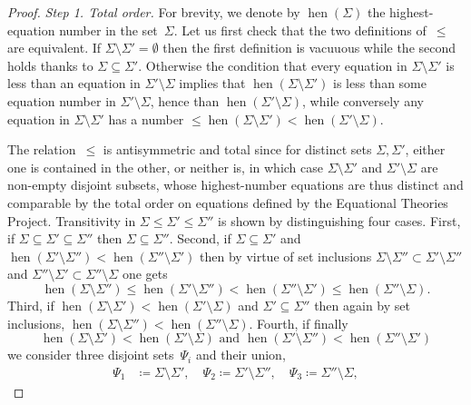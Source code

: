 \documentclass[12pt]{amsart}
\theoremstyle{plain}
\theoremstyle{definition}
\DeclareMathOperator{\hen}{hen}
\begin{document}
\begin{proof}
  {\it Step 1. Total order.}
  For brevity, we denote by $\hen(\Sigma)$ the highest-equation number in the set~$\Sigma$.
  Let us first check that the two definitions of~$\leq$ are equivalent.  If $\Sigma\setminus\Sigma'=\emptyset$ then the first definition is vacuuous while the second holds thanks to $\Sigma\subseteq\Sigma'$.  Otherwise the condition that every equation in $\Sigma\setminus\Sigma'$ is less than an equation in $\Sigma'\setminus\Sigma$ implies that $\hen(\Sigma\setminus\Sigma')$ is less than some equation number in $\Sigma'\setminus\Sigma$, hence than $\hen(\Sigma'\setminus\Sigma)$, while conversely any equation in $\Sigma\setminus\Sigma'$ has a number ${}\leq\hen(\Sigma\setminus\Sigma')<\hen(\Sigma'\setminus\Sigma)$.

  The relation~$\leq$ is antisymmetric and total since for distinct sets $\Sigma,\Sigma'$, either one is contained in the other, or neither is, in which case $\Sigma\setminus\Sigma'$ and $\Sigma'\setminus\Sigma$ are non-empty disjoint subsets, whose highest-number equations are thus distinct and comparable by the total order on equations defined by the Equational Theories Project.
  Transitivity in $\Sigma\leq\Sigma'\leq\Sigma''$ is shown by distinguishing four cases.  First, if $\Sigma\subseteq\Sigma'\subseteq\Sigma''$ then $\Sigma\subseteq\Sigma''$.  Second, if $\Sigma\subseteq\Sigma'$ and $\hen(\Sigma'\setminus\Sigma'')<\hen(\Sigma''\setminus\Sigma')$ then by virtue of set inclusions $\Sigma\setminus\Sigma''\subset\Sigma'\setminus\Sigma''$ and $\Sigma''\setminus\Sigma'\subset\Sigma''\setminus\Sigma$ one gets
\begin{equation}
\hen(\Sigma\setminus\Sigma'')\leq\hen(\Sigma'\setminus\Sigma'')<\hen(\Sigma''\setminus\Sigma')\leq\hen(\Sigma''\setminus\Sigma) .
\end{equation}
Third, if $\hen(\Sigma\setminus\Sigma')<\hen(\Sigma'\setminus\Sigma)$ and $\Sigma'\subseteq\Sigma''$ then again by set inclusions, $\hen(\Sigma\setminus\Sigma'')<\hen(\Sigma''\setminus\Sigma)$.  Fourth, if finally
\begin{equation}\label{hen-hen-assume}
  \hen(\Sigma\setminus\Sigma')<\hen(\Sigma'\setminus\Sigma) \text{ and }
  \hen(\Sigma'\setminus\Sigma'')<\hen(\Sigma''\setminus\Sigma')
\end{equation}
we consider three disjoint sets~$\Psi_i$ and their union,
\begin{equation}
  \begin{aligned}
    \Psi_1 & \coloneqq \Sigma\setminus\Sigma' , \quad \Psi_2 \coloneqq \Sigma'\setminus\Sigma'' , \quad \Psi_3 \coloneqq \Sigma''\setminus\Sigma ,

\end{aligned}
\end{equation}
\end{proof}
\end{document}
